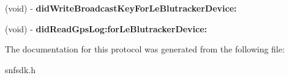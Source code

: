 \begin{DoxyCompactItemize}
\item 
\hypertarget{protocol_le_blutracker_device_delegate-p_aab0a76312c3378262b8656ae262c4bb3}{}(void) -\/ {\bfseries did\+Write\+Broadcast\+Key\+For\+Le\+Blutracker\+Device\+:}\label{protocol_le_blutracker_device_delegate-p_aab0a76312c3378262b8656ae262c4bb3}

\item 
\hypertarget{protocol_le_blutracker_device_delegate-p_af3c9a7bb5766d3b5ba44faf78b27265e}{}(void) -\/ {\bfseries did\+Read\+Gps\+Log\+:for\+Le\+Blutracker\+Device\+:}\label{protocol_le_blutracker_device_delegate-p_af3c9a7bb5766d3b5ba44faf78b27265e}

\end{DoxyCompactItemize}


The documentation for this protocol was generated from the following file\+:\begin{DoxyCompactItemize}
\item 
snfsdk.\+h\end{DoxyCompactItemize}
